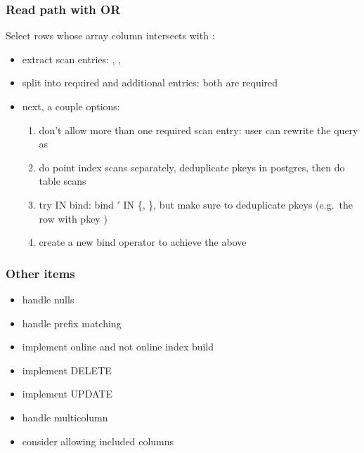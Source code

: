 \begin{frame}
  \frametitle{Read path with OR}
  Select rows whose array column intersects with :

  \pause

  \begin{itemize}
    \item extract scan entries: , , 
      \pause
    \item split into required and additional entries: both are required
      \pause
    \item next, a couple options:
      \pause
      \begin{enumerate}
        \item don't allow more than one required scan entry: user can rewrite
          the query as 
          \pause
        \item do point index scans separately, deduplicate pkeys in postgres,
          then do table scans
          \pause
        \item try IN bind: bind $'$ IN \{,
          \}, but make sure to deduplicate pkeys (e.g.\ the row
          with pkey )
          \pause
        \item create a new bind operator to achieve the above
      \end{enumerate}
  \end{itemize}
\end{frame}

\begin{frame}
  \frametitle{Other items}
  \begin{itemize}
    \item handle nulls
      \pause
    \item handle prefix matching
      \pause
    \item implement online and not online index build
      \pause
    \item implement DELETE
      \pause
    \item implement UPDATE
      \pause
    \item handle multicolumn
      \pause
    \item consider allowing included columns
  \end{itemize}
\end{frame}
